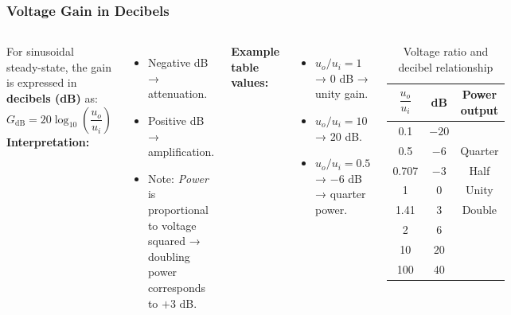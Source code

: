 \begin{frame}
	\frametitle{Voltage Gain in Decibels}
\small
	\small
	\begin{columns}
			For sinusoidal steady-state, the gain is expressed in \textbf{decibels (dB)} as:
			\begin{equation}
				G_{\mathrm{dB}} = 20 \log_{10}\left(\frac{u_o}{u_i}\right)
			\end{equation}
			\textbf{Interpretation:}
			\begin{itemize}
				\item Negative dB → attenuation.
				\item Positive dB → amplification.
				\item Note: \emph{Power} is proportional to voltage squared → doubling power corresponds to $+3$ dB.
			\end{itemize}
			\textbf{Example table values:}
			\begin{itemize}
				\item $u_o/u_i = 1$ → $0$ dB → unity gain.
				\item $u_o/u_i = 10$ → $20$ dB.
				\item $u_o/u_i = 0.5$ → $-6$ dB → quarter power.
			\end{itemize}
			\begin{table}
				\begin{tabular}{@{}ccc@{}}
					\toprule
					$\dfrac{u_o}{u_i}$ & dB & Power output \\
					\midrule
					0.1   & $-20$ &  \\
					0.5   & $-6$  & Quarter \\
					0.707 & $-3$  & Half \\
					1     & $0$   & Unity \\
					1.41  & $3$   & Double \\
					2     & $6$   &  \\
					10    & $20$  &  \\
					100   & $40$  &  \\
					\bottomrule
				\end{tabular}
				\caption{Voltage ratio and decibel relationship}
				\label{tab:voltage_ratio_db}
			\end{table}
	\end{columns}
\end{frame}

